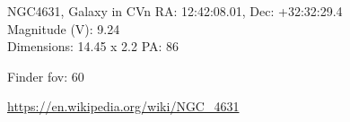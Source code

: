 \begin{block}{NGC4631, Galaxy in CVn}
    RA: 12:42:08.01, Dec: +32:32:29.4 \\ 
    Magnitude (V): 9.24 \\ 
    Dimensions: 14.45 x 2.2 PA: 86 

    Finder fov: 60 

    \url{https://en.wikipedia.org/wiki/NGC_4631} 
\end{block}